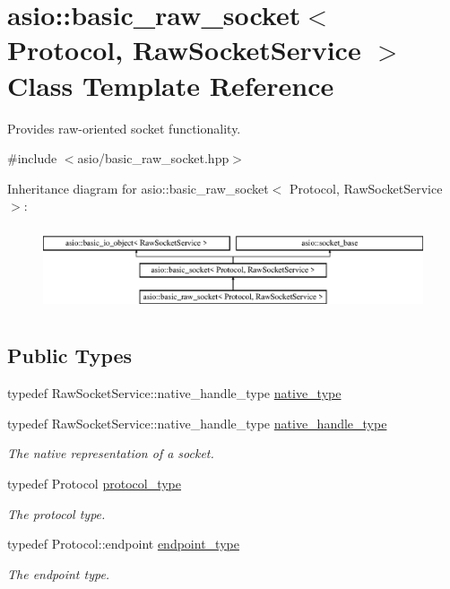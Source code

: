 \hypertarget{classasio_1_1basic__raw__socket}{}\section{asio\+:\+:basic\+\_\+raw\+\_\+socket$<$ Protocol, Raw\+Socket\+Service $>$ Class Template Reference}
\label{classasio_1_1basic__raw__socket}


Provides raw-\/oriented socket functionality.  




{\ttfamily \#include $<$asio/basic\+\_\+raw\+\_\+socket.\+hpp$>$}

Inheritance diagram for asio\+:\+:basic\+\_\+raw\+\_\+socket$<$ Protocol, Raw\+Socket\+Service $>$\+:\begin{figure}[H]
\begin{center}
\leavevmode
\includegraphics[height=2.500000cm]{classasio_1_1basic__raw__socket}
\end{center}
\end{figure}
\subsection*{Public Types}
\begin{DoxyCompactItemize}
\item 
typedef Raw\+Socket\+Service\+::native\+\_\+handle\+\_\+type \hyperlink{classasio_1_1basic__raw__socket_aef7c77cd3736fffd674702695c63287c}{native\+\_\+type}
\item 
typedef Raw\+Socket\+Service\+::native\+\_\+handle\+\_\+type \hyperlink{classasio_1_1basic__raw__socket_aa95021a3bc7d9d5a4648d4d82f57b8ae}{native\+\_\+handle\+\_\+type}
\begin{DoxyCompactList}\small\item\em The native representation of a socket. \end{DoxyCompactList}\item 
typedef Protocol \hyperlink{classasio_1_1basic__raw__socket_aa7e790d1b35972ac2c4d1d5999b94d93}{protocol\+\_\+type}
\begin{DoxyCompactList}\small\item\em The protocol type. \end{DoxyCompactList}\item 
typedef Protocol\+::endpoint \hyperlink{classasio_1_1basic__raw__socket_a75803815223ab2cbfa66c51a650236b5}{endpoint\+\_\+type}
\begin{DoxyCompactList}\small\item\em The endpoint type. \end{DoxyCompactList}\end{DoxyCompactItemize}
